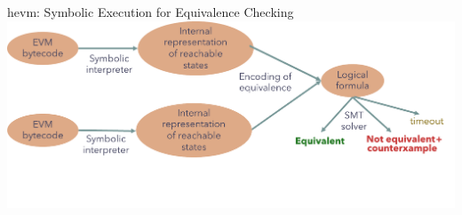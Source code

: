 \documentclass[aspectratio=169]{beamer}
\begin{document}
\begin{frame}{hevm: Symbolic Execution for Equivalence Checking}
\centering
\includegraphics[scale=0.45]{equivalence-pipeline}
\end{frame}
%
%
%
%
\end{document}
